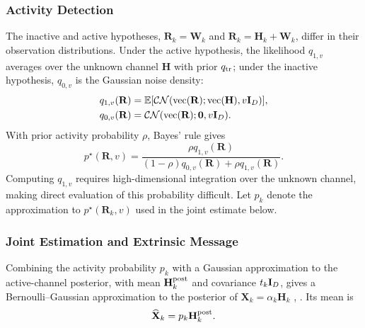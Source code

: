 \subsubsection{Activity Detection}
\label{sec:activity-detection}

The inactive and active hypotheses, $\mathbf R_k=\mathbf W_k$ and
$\mathbf R_k=\mathbf H_k+\mathbf W_k$, differ in their observation
distributions. Under the active hypothesis, the likelihood $q_{1,v}$
averages over the unknown channel $\mathbf H$ with prior $q_{\rm tr}$;
under the inactive hypothesis, $q_{0,v}$ is the Gaussian noise density:
\begin{align}
 q_{1,v}(\mathbf R)&=\mathbb{E}[\mathcal{CN}(\operatorname{vec}(\mathbf R);\operatorname{vec}(\mathbf H),v\mathbf{I}_D)],
 \label{eq:query-densities}\\
 q_{0,v}(\mathbf R)&=\mathcal{CN}(\operatorname{vec}(\mathbf R);\mathbf0,v\mathbf{I}_D).
 \label{eq:inactive-density}
\end{align}
With prior activity probability $\rho$, Bayes' rule gives
\begin{equation}
 p^\star(\mathbf R,v)=\frac{\rho q_{1,v}(\mathbf R)}
 {(1-\rho)q_{0,v}(\mathbf R)+\rho q_{1,v}(\mathbf R)}.
 \label{eq:local-activity}
\end{equation}
Computing $q_{1,v}$ requires high-dimensional integration over the unknown
channel, making direct evaluation of this probability difficult.
Let $p_k$ denote the approximation to $p^\star(\mathbf R_k,v)$ used in the joint
estimate below.

\subsubsection{Joint Estimation and Extrinsic Message}
\label{sec:joint-extrinsic}

Combining the activity probability $p_k$ with a Gaussian approximation
to the active-channel posterior, with mean $\mathbf H_k^{\rm post}$
and covariance $t_k\mathbf{I}_D$, gives a Bernoulli--Gaussian approximation
to the posterior of $\mathbf X_k=\alpha_k\mathbf H_k$
\cite[Secs.~III-C--III-D]{liu2018}, \cite[Sec.~III-B]{cai2026}.
Its mean is
\begin{equation}
 \widehat{\mathbf X}_k=p_k\mathbf H_k^{\rm post}.
 \label{eq:mixture}
\end{equation}

